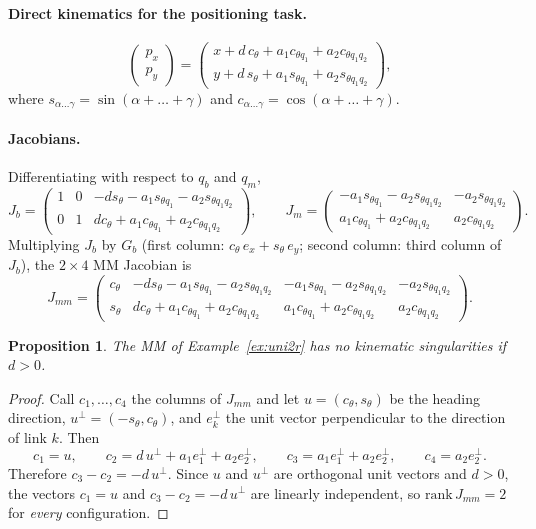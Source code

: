 \documentclass[11pt,a4paper]{article}
\def\bm#1{#1}%
\newcommand{\qbase}{\bm{q}_b}
\newcommand{\qarm}{\bm{q}_m}
\newcommand{\Gbase}{\bm{G}_b}
\newcommand{\Jbase}{\bm{J}_b}
\newcommand{\Jarm}{\bm{J}_m}
\newcommand{\Jmm}{\bm{J}_{mm}}
\theoremstyle{definition}
\theoremstyle{plain}
\newtheorem{proposition}[definition]{Proposition}
\theoremstyle{remark}
\begin{document}
\paragraph{Direct kinematics for the positioning task.}
\[
\begin{pmatrix}p_x\\ p_y\end{pmatrix}=
\begin{pmatrix}x+d\,c_\theta+a_1c_{\theta q_1}+a_2c_{\theta q_1q_2}\\[2pt]
y+d\,s_\theta+a_1s_{\theta q_1}+a_2s_{\theta q_1q_2}\end{pmatrix},
\]
where $s_{\alpha\dots\gamma}=\sin(\alpha+\dots+\gamma)$ and $c_{\alpha\dots\gamma}=\cos(\alpha+\dots+\gamma)$.

\paragraph{Jacobians.} Differentiating with respect to $\qbase$ and $\qarm$,
\[
\Jbase=\begin{pmatrix}1&0&-d s_\theta-a_1s_{\theta q_1}-a_2s_{\theta q_1q_2}\\
0&1&d c_\theta+a_1c_{\theta q_1}+a_2c_{\theta q_1q_2}\end{pmatrix},\qquad
\Jarm=\begin{pmatrix}-a_1s_{\theta q_1}-a_2s_{\theta q_1q_2}&-a_2s_{\theta q_1q_2}\\
a_1c_{\theta q_1}+a_2c_{\theta q_1q_2}&a_2c_{\theta q_1q_2}\end{pmatrix}.
\]
Multiplying $\Jbase$ by $\Gbase$ (first column: $c_\theta\,\bm e_x+s_\theta\,\bm e_y$; second column: third column of $\Jbase$), the $2\times4$ MM Jacobian is
\[
\Jmm=\begin{pmatrix}
c_\theta & -d s_\theta-a_1s_{\theta q_1}-a_2s_{\theta q_1q_2} & -a_1s_{\theta q_1}-a_2s_{\theta q_1q_2} & -a_2s_{\theta q_1q_2}\\
s_\theta & d c_\theta+a_1c_{\theta q_1}+a_2c_{\theta q_1q_2} & a_1c_{\theta q_1}+a_2c_{\theta q_1q_2} & a_2c_{\theta q_1q_2}
\end{pmatrix}.
\]

\begin{proposition}\label{prop:nosing}
The MM of Example~\ref{ex:uni2r} has no kinematic singularities if $d>0$.
\end{proposition}

\begin{proof}
Call $\bm c_1,\dots,\bm c_4$ the columns of $\Jmm$ and let $\bm u=(c_\theta,s_\theta)$ be the heading direction, $\bm u^\perp=(-s_\theta,c_\theta)$, and $\bm e_k^\perp$ the unit vector perpendicular to the direction of link $k$. Then
\[
\bm c_1=\bm u,\qquad
\bm c_2=d\,\bm u^\perp+a_1\bm e_1^\perp+a_2\bm e_2^\perp,\qquad
\bm c_3=a_1\bm e_1^\perp+a_2\bm e_2^\perp,\qquad
\bm c_4=a_2\bm e_2^\perp .
\]
Therefore $\bm c_3-\bm c_2=-d\,\bm u^\perp$. Since $\bm u$ and $\bm u^\perp$ are orthogonal unit vectors and $d>0$, the vectors $\bm c_1=\bm u$ and $\bm c_3-\bm c_2=-d\,\bm u^\perp$ are linearly independent, so $\mathrm{rank}\,\Jmm=2$ for \emph{every} configuration.
\end{proof}
\end{document}
